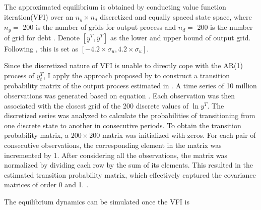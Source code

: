 The approximated equilibrium is obtained by conducting value function iteration(VFI) over an $n_y \times n_d$ discretized and equally spaced state space, where $n_y = $ 200 is the number of grids for output process and $n_d=$ 200 is the number of grid for debt \citep{Na-18}. Denote $[\underline{y}^T, \overline{y}^T]$ as the lower and upper bound of output grid. Following \citet{Uribe-Schmitt-Grohe-textbook}, this is set as $[-4.2 \times \sigma_u, 4.2 \times \sigma_u]$. 

Since the discretized nature of VFI is unable to directly cope with the AR(1) process of $y^T_t$, I apply the approach proposed by \citet*{schmitt-09-finite} to construct a transition probability matrix of the output process estimated in .
A time series of 10 million observations was generated based on equation . Each observation was then associated with the closest grid of the 200 discrete values of $\ln y^T$. The discretized series was analyzed to calculate the probabilities of transitioning from one discrete state to another in consecutive periods.
To obtain the transition probability matrix, a $200\times200$ matrix was initialized with zeros. For each pair of consecutive observations, the corresponding element in the matrix was incremented by 1. After considering all the observations, the matrix was normalized by dividing each row by the sum of its elements. This resulted in the estimated transition probability matrix, which effectively captured the covariance matrices of order 0 and 1.
\citep*{Uribe-Schmitt-Grohe-textbook}.

The equilibrium dynamics can be simulated once the VFI is 

